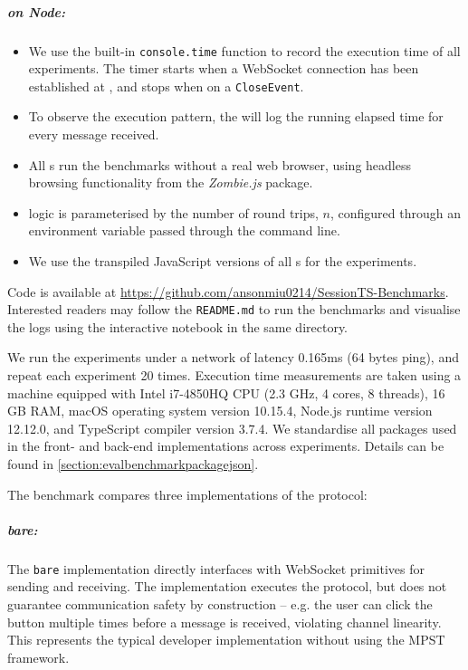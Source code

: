 \subparagraph{  on Node:}
\begin{itemize}

\item We use the built-in \texttt{console.time} function to record
the execution time of all experiments. 
The timer starts when a WebSocket connection has been established at
, and stops when on a \texttt{CloseEvent}.

\item To observe the execution pattern, the  will log the running 
elapsed time for every  message received.

\item All s run the benchmarks without a real web browser,
using headless browsing functionality from 
the \textit{Zombie.js} \cite{zombie} package.

\item {} logic is parameterised by the number of round trips,
$n$, configured through an environment variable passed through 
the command line.

\item We use the transpiled JavaScript versions of all s
for the experiments.

\end{itemize}

Code is available at
\url{https://github.com/ansonmiu0214/SessionTS-Benchmarks}.
Interested readers may follow the \texttt{README.md}
to run the benchmarks and visualise the logs using the 
interactive notebook in the same directory.

We run the experiments under a network of latency 0.165ms
(64 bytes ping), and repeat each experiment 20 times.
Execution time measurements  are taken using a machine 
equipped with Intel i7-4850HQ CPU (2.3 GHz, 4 cores, 8 threads), 
16 GB RAM, macOS operating system version 10.15.4, 
Node.js runtime version 12.12.0, and
TypeScript compiler version 3.7.4.
We standardise all packages used in the front- and back-end
implementations across experiments. Details can be found in
\cref{section:evalbenchmarkpackagejson}.

The benchmark compares three implementations of 
the  protocol:

\subparagraph{bare:}
The \texttt{bare} implementation directly interfaces with 
WebSocket primitives for sending and receiving. 
The implementation executes the  protocol, but does not 
guarantee communication safety by construction -- e.g. the user can click
the  button multiple times before a  message 
is received, violating channel linearity. 
This represents the typical developer implementation without using the
MPST framework.


